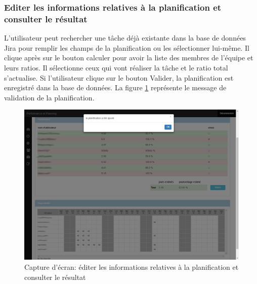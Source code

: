 \subsubsection{Editer les informations relatives à la planification et consulter le résultat}
L'utilisateur peut rechercher une tâche déjà existante dans la base de données Jira pour remplir les champs de la planification ou les sélectionner lui-même. Il clique après sur le bouton calculer pour avoir la liste des membres de l'équipe et leurs ratios. Il sélectionne ceux qui vont réaliser la tâche et le ratio total s'actualise. Si l'utilisateur clique sur le bouton Valider, la planification est enregistré dans la base de données. La figure \ref{code96} représente le message de validation de la planification.
\begin{figure}[H]
  \centering
 \includegraphics[scale=0.37]{figures/printscreen_app/12_5.PNG}
 \caption{Capture d'écran: éditer les informations relatives à la planification et consulter le résultat}
 \label{code96}
\end{figure}

